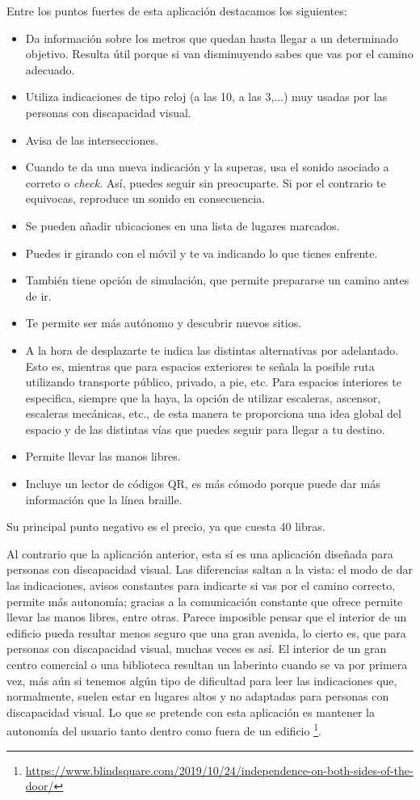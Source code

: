 Entre los puntos fuertes de esta aplicación destacamos los siguientes:
\begin{itemize}
	\item Da información sobre los metros que quedan hasta llegar a un determinado objetivo. Resulta útil porque si van disminuyendo sabes que vas por el camino adecuado.
	\item Utiliza indicaciones de tipo reloj (a las 10, a las 3,...) muy usadas por las personas con discapacidad visual.
	\item Avisa de las intersecciones. 
	\item Cuando te da una nueva indicación y la superas, usa el sonido asociado a correto o \textit{check}. Así, puedes seguir sin preocuparte. Si por el contrario te equivocas, reproduce un sonido en consecuencia.
	\item Se pueden añadir ubicaciones en una lista de lugares marcados.
	\item Puedes ir girando con el móvil y te va indicando lo que tienes enfrente. 
	\item También tiene opción de simulación, que permite prepararse un camino antes de ir.
	\item Te permite ser más autónomo y descubrir nuevos sitios.
	\item A la hora de desplazarte te indica las distintas alternativas por adelantado. Esto es, mientras que para espacios exteriores te señala la posible ruta utilizando transporte público, privado, a pie, etc. Para espacios interiores te especifica, siempre que la haya, la opción de utilizar escaleras, ascensor, escaleras mecánicas, etc., de esta manera te proporciona una idea global del espacio y de las distintas vías que puedes seguir para llegar a tu destino.
	\item Permite llevar las manos libres.
	\item Incluye un lector de códigos QR, es más cómodo porque puede dar más información que la línea braille.
\end{itemize}

Su principal punto negativo es el precio, ya que cuesta 40 libras.

Al contrario que la aplicación anterior, esta sí es una aplicación diseñada para personas con discapacidad visual. Las diferencias saltan a la vista: el modo de dar las indicaciones, avisos constantes para indicarte si vas por el camino correcto, permite más autonomía; gracias a la comunicación constante que ofrece permite llevar las manos libres, entre otras. Parece imposible pensar que el interior de un edificio pueda resultar menos seguro que una gran avenida, lo cierto es, que para personas con discapacidad visual, muchas veces es así. El interior de un gran centro comercial o una biblioteca resultan un laberinto cuando se va por primera vez, más aún si tenemos algún tipo de dificultad para leer las indicaciones que, normalmente, suelen estar en lugares altos y no adaptadas para personas con discapacidad visual. Lo que se pretende con esta aplicación es mantener la autonomía del usuario tanto dentro como fuera de un edificio \footnote{\url{https://www.blindsquare.com/2019/10/24/independence-on-both-sides-of-the-door/}}.


